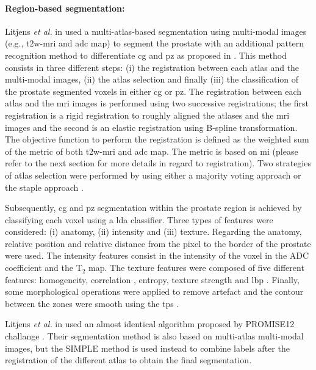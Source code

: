 \paragraph{Region-based segmentation:}
Litjens \textit{et al.} in \cite{Litjens2012} used a multi-atlas-based segmentation using multi-modal images (e.g., \ac{t2w}-\ac{mri} and \ac{adc} map) to segment the prostate with an additional pattern recognition method to differentiate \ac{cg} and \ac{pz} as proposed in \cite{Litjens2012a}.
This method consists in three different steps: (i) the registration between each atlas and the multi-modal images, (ii) the atlas selection and finally (iii) the classification of the prostate segmented voxels in either \ac{cg} or \ac{pz}. 
The registration between each atlas and the \ac{mri} images is performed using two successive registrations; the first registration is a rigid registration to roughly aligned the atlases and the \ac{mri} images and the second is an elastic registration using B-spline transformation.
The objective function to perform the registration is defined as the weighted sum of the metric of both \ac{t2w}-\ac{mri} and \ac{adc} map.
The metric is based on \ac{mi} (please refer to the next section for more details in regard to registration).
Two strategies of atlas selection were performed by using either a majority voting approach or the \ac{staple} approach \cite{Warfield2004}.

Subsequently,  \ac{cg} and \ac{pz} segmentation within the prostate region is achieved by classifying each voxel using a \ac{lda} classifier.
Three types of features were considered: (i) anatomy, (ii) intensity and (iii) texture.
Regarding the anatomy, relative position and relative distance from the pixel to the border of the prostate were used.
The intensity features consist in the intensity of the voxel in the ADC coefficient and the T$_2$ map.
The texture features were composed of five different features: homogeneity, correlation \cite{Amadasun1989}, entropy, texture strength \cite{Li2005a} and \ac{lbp} \cite{Ojala1996}.
Finally, some morphological operations were applied to remove artefact and the contour between the zones were smooth using the \ac{tps} \cite{Bookstein1989}.

Litjens \textit{et al.} in \cite{Litjens2014} used an almost identical algorithm proposed by PROMISE12 challange \cite{Litjens2014a}.
Their segmentation method is also based on multi-atlas multi-modal images, but the SIMPLE method \cite{langerak2010label} is used instead to combine labels after the registration of the different atlas to obtain the final segmentation.
 
